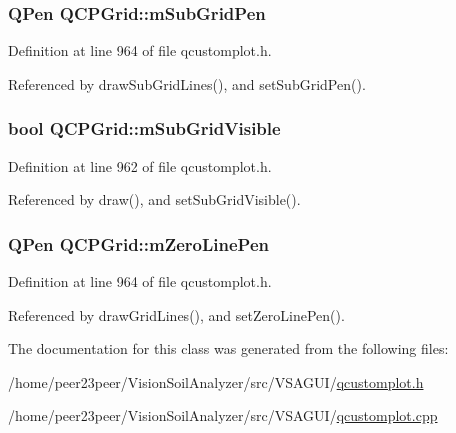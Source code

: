 \subsubsection[{m\+Sub\+Grid\+Pen}]{\setlength{\rightskip}{0pt plus 5cm}Q\+Pen Q\+C\+P\+Grid\+::m\+Sub\+Grid\+Pen\hspace{0.3cm}{\ttfamily [protected]}}\label{class_q_c_p_grid_aa9004bc139ad3ea92629f0aaae81d83f}


Definition at line 964 of file qcustomplot.\+h.



Referenced by draw\+Sub\+Grid\+Lines(), and set\+Sub\+Grid\+Pen().

\hypertarget{class_q_c_p_grid_a4e4a0400d6319bb44c06341f6298c87b}{}
\subsubsection[{m\+Sub\+Grid\+Visible}]{\setlength{\rightskip}{0pt plus 5cm}bool Q\+C\+P\+Grid\+::m\+Sub\+Grid\+Visible\hspace{0.3cm}{\ttfamily [protected]}}\label{class_q_c_p_grid_a4e4a0400d6319bb44c06341f6298c87b}


Definition at line 962 of file qcustomplot.\+h.



Referenced by draw(), and set\+Sub\+Grid\+Visible().

\hypertarget{class_q_c_p_grid_a379481871f17655c27eda30af233554f}{}
\subsubsection[{m\+Zero\+Line\+Pen}]{\setlength{\rightskip}{0pt plus 5cm}Q\+Pen Q\+C\+P\+Grid\+::m\+Zero\+Line\+Pen\hspace{0.3cm}{\ttfamily [protected]}}\label{class_q_c_p_grid_a379481871f17655c27eda30af233554f}


Definition at line 964 of file qcustomplot.\+h.



Referenced by draw\+Grid\+Lines(), and set\+Zero\+Line\+Pen().



The documentation for this class was generated from the following files\+:\begin{DoxyCompactItemize}
\item 
/home/peer23peer/\+Vision\+Soil\+Analyzer/src/\+V\+S\+A\+G\+U\+I/\hyperlink{qcustomplot_8h}{qcustomplot.\+h}\item 
/home/peer23peer/\+Vision\+Soil\+Analyzer/src/\+V\+S\+A\+G\+U\+I/\hyperlink{qcustomplot_8cpp}{qcustomplot.\+cpp}\end{DoxyCompactItemize}
